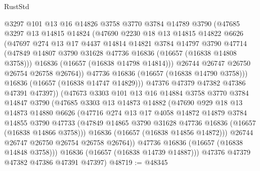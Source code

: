 \begin{lexlean}{RustStd}
\begin{coremodule}
                @3297
                @101
                @13
                @16
                @14826
                @3758
                @3770
                @3784
                @14789
                @3790
                (@47685
                  @3297
                  @13
                  @14815
                  @14824
                  (@47690
                    @2230
                    @18
                    @13
                    @14815
                    @14822
                    @6626
                    (@47697
                      @274
                      @13
                      @17
                      @4437
                      @14814
                      @14821
                      @3784
                      @14797
                      @3790
                      @47714
                      (@47849 @14807 @3790 @31628 @47736 @16836 (@16657 (@16838 @14808 @3758)))
                      @16836
                      (@16657 (@16838 @14798 @14814)))
                    @26744
                    @26747
                    @26750
                    @26754
                    @26758
                    @26764))
                @47736
                @16836
                (@16657 (@16838 @14790 @3758)))
              @16836
              (@16657 (@16838 @14747 @14829)))
            @47376
            @47379
            @47382
            @47386
            @47391
            @47397))
        (@47673
          @3303
          @101
          @13
          @16
          @14884
          @3758
          @3770
          @3784
          @14847
          @3790
          (@47685
            @3303
            @13
            @14873
            @14882
            (@47690
              @929
              @18
              @13
              @14873
              @14880
              @6626
              (@47716
                @274
                @13
                @17
                @4058
                @14872
                @14879
                @3784
                @14855
                @3790
                @47733
                (@47849 @14865 @3790 @31628 @47736 @16836 (@16657 (@16838 @14866 @3758)))
                @16836
                (@16657 (@16838 @14856 @14872)))
              @26744
              @26747
              @26750
              @26754
              @26758
              @26764))
          @47736
          @16836
          (@16657 (@16838 @14848 @3758)))
        @16836
        (@16657 (@16838 @14739 @14887)))
      @47376
      @47379
      @47382
      @47386
      @47391
      @47397)
@48719 := @48345

\end{coremodule}
\end{lexlean}
